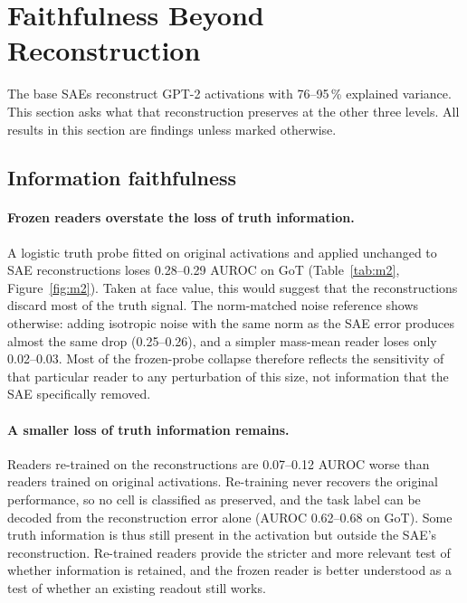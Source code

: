 \section{Faithfulness Beyond Reconstruction}\label{sec:beyond}

The base SAEs reconstruct GPT-2 activations with 76--95\,\% explained variance. This section asks what that
reconstruction preserves at the other three levels. All results in this section are  findings
unless marked otherwise.

\subsection{Information faithfulness}\label{sec:info}

\paragraph{Frozen readers overstate the loss of truth information.} A logistic truth probe fitted on original
activations and applied unchanged to SAE reconstructions loses 0.28--0.29 AUROC on GoT (Table~\ref{tab:m2},
Figure~\ref{fig:m2}). Taken at face value, this would suggest that the reconstructions discard most of the truth
signal. The norm-matched noise reference shows otherwise: adding isotropic noise with the same norm as the SAE error
produces almost the same drop (0.25--0.26), and a simpler mass-mean reader loses only 0.02--0.03. Most of the
frozen-probe collapse therefore reflects the sensitivity of that particular reader to any perturbation of this size,
not information that the SAE specifically removed.

\paragraph{A smaller loss of truth information remains.} Readers re-trained on the reconstructions are 0.07--0.12
AUROC worse than readers trained on original activations. Re-training never recovers the original performance, so no
cell is classified as preserved, and the task label can be decoded from the reconstruction error alone (AUROC
0.62--0.68 on GoT). Some truth information is thus still present in the activation but outside the SAE's
reconstruction. Re-trained readers provide the stricter and more relevant test of whether information is retained,
and the frozen reader is better understood as a test of whether an existing readout still works.


